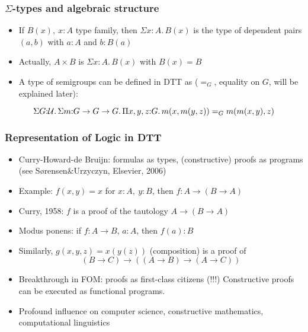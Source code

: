 \documentclass[handout]{beamer}
\newcommand{\depi}[3]{\Pi{#1{:}#2.\,#3}}
\newcommand{\sigm}[3]{\Sigma{#1{:}#2.\,#3}}
\newcommand{\UU}{{\cal U}}
\begin{document}
\frame
  {

    \frametitle{$\Sigma$-types and algebraic structure}

    \begin{itemize}[<+->]
    \item If $B(x),~x:A$ type family, then $\sigm{x}{A}{B(x)}$ is the type of dependent
    pairs $(a,b)$  with $a:A$ and $b:B(a)$
    \item Actually, $A\times B$ is $\sigm{x}{A}{B(x)}$ with $B(x)=B$
    \item A type of semigroups can be defined in DTT as ($=_G$,
    equality on $G$, will be explained later):
    \end{itemize}
\[\sigm{G}{\UU}{\sigm{m}{G\to G\to G}{\depi{x,y,z}{G}{m(x,m(y,z)) =_G m(m(x,y),z)}}}\]
  }



 \frame
  {

    \frametitle{Representation of Logic in DTT}

    \begin{itemize}[<+->]
    \item Curry-Howard-de Bruijn: formulas as types, (constructive) proofs as programs
(see Sørensen\&Urzyczyn, Elsevier, 2006)
    \item Example: $f(x,y)=x$ for $x:A,~y:B$, then $f: A \to (B\to A)$
    \item Curry, 1958: $f$ is a proof of the tautology $A \to (B\to A)$
    \item Modus ponens: if $f:A\to B$, $a:A$, then $f(a):B$
    \item Similarly, $g(x,y,z)=x(y(z))$ (composition) is a proof of
     \[(B\to C) \to ((A\to B) \to (A\to C)) \]
    \item Breakthrough in FOM: proofs as first-class citizens (!!!)
 Constructive proofs can be executed as functional programs.
   \item Profound influence on computer science, constructive mathematics, computational
   linguistics
    \end{itemize}
  }
\end{document}
